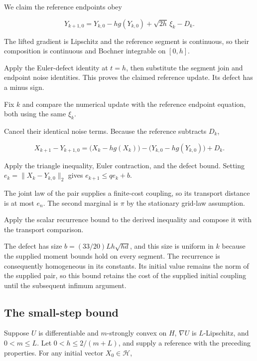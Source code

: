 \documentclass[11pt,a4paper]{article}
\begin{document}
We claim the reference endpoints obey

\[Y_{k+1,0}=Y_{k,0}-hg(Y_{k,0})+\sqrt{2h}\,\xi_k-D_k.\]

The lifted gradient is Lipschitz and the reference segment is continuous, so their composition is continuous and Bochner integrable on \([0,h]\).



Apply the Euler-defect identity at \(t=h\), then substitute the segment join and endpoint noise identities. This proves the claimed reference update. Its defect has a minus sign.



Fix \(k\) and compare the numerical update with the reference endpoint equation, both using the same \(\xi_k\).



Cancel their identical noise terms. Because the reference subtracts \(D_k\),

\[X_{k+1}-Y_{k+1,0}=\bigl(X_k-hg(X_k)\bigr)-\bigl(Y_{k,0}-hg(Y_{k,0})\bigr)+D_k.\]

Apply the triangle inequality, Euler contraction, and the defect bound. Setting \(e_k=\|X_k-Y_{k,0}\|_2\) gives \(e_{k+1}\le qe_k+b\).



The joint law of the pair supplies a finite-cost coupling, so its transport distance is at most \(e_n\). The second marginal is \(\pi\) by the stationary grid-law assumption.



Apply the scalar recurrence bound to the derived inequality and compose it with the transport comparison.



The defect has size \(b=(33/20)Lh\sqrt{hd}\), and this size is uniform in \(k\) because the supplied moment bounds hold on every segment. The recurrence is consequently homogeneous in its constants. Its initial value remains the norm of the supplied pair, so this bound retains the cost of the supplied initial coupling until the subsequent infimum argument.


\subsection{\texorpdfstring{The small-step bound}{The small-step bound}}


Suppose \(U\) is differentiable and \(m\)-strongly convex on \(H\), \(\nabla U\) is \(L\)-Lipschitz, and \(0<m\le L\). Let \(0<h\le2/(m+L)\), and supply a reference with the preceding properties. For any initial vector \(X_0\in\mathcal H\),
\end{document}
